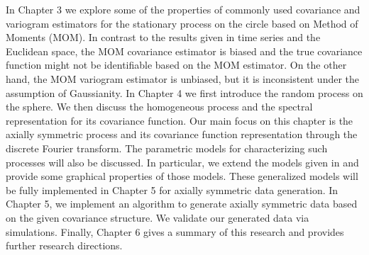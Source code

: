 In Chapter 3 we explore some of the properties of commonly used covariance and variogram estimators for the stationary process on the circle based on Method of Moments (MOM). In contrast to the results given in time series and the Euclidean space, the MOM covariance estimator is biased and the true covariance function might not be identifiable based on the MOM estimator. On the other hand, the MOM variogram estimator is unbiased, but it is inconsistent under the assumption of Gaussianity. In Chapter 4 we first introduce the random process on the sphere. We then discuss the homogeneous process and the spectral representation for its covariance function. Our main focus on this chapter is the axially symmetric process and its covariance function representation through the discrete Fourier transform. The parametric models for characterizing such processes will also be discussed. In particular, we extend the models given in \cite{Huang2012} and provide some graphical properties of those models. These generalized models will be fully implemented in Chapter 5 for axially symmetric data generation. In Chapter 5, we implement an algorithm to generate axially symmetric data based on the given covariance structure. We validate our generated data via simulations. Finally, Chapter 6 gives a summary of this research and provides further research directions.



